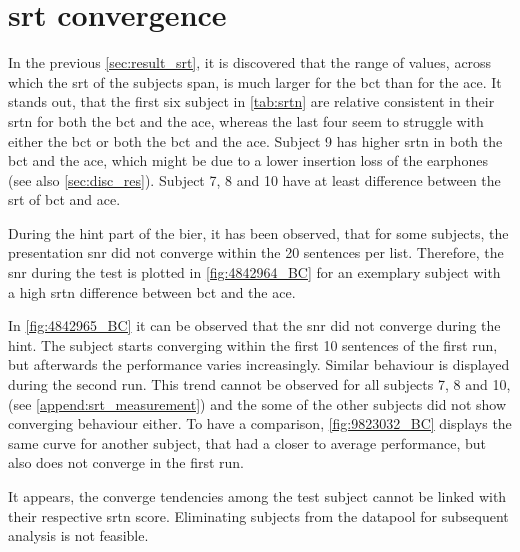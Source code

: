 \section{\gls{srt} convergence}
In the previous \autoref{sec:result_srt}, it is discovered that the range of values, across which the \gls{srt} of the subjects span, is much larger for the \gls{bct} than for the \gls{ace}. 
It stands out, that the first six subject in \autoref{tab:srtn} are relative consistent in their \gls{srtn} for both the \gls{bct} and the \gls{ace}, whereas the last four seem to struggle with either the \gls{bct} or both the \gls{bct} and the \gls{ace}. Subject 9 has higher \gls{srtn} in both the \gls{bct} and the \gls{ace}, which might be due to a lower insertion loss of the earphones (see also \autoref{sec:disc_res}). Subject 7, 8 and 10 have at least  difference between the \gls{srt} of \gls{bct} and \gls{ace}. 


During the \gls{hint} part of the \gls{bier}, it has been observed, that for some subjects, the presentation \gls{snr} did not converge within the 20 sentences per list. 
Therefore, the \gls{snr} during the test is plotted in \autoref{fig:4842964_BC} for an exemplary subject with a high \gls{srtn} difference between \gls{bct} and the \gls{ace}. 



In \autoref{fig:4842965_BC} it can be observed that the \gls{snr} did not converge during the \gls{hint}. The subject starts converging within the first 10 sentences of the first run, but afterwards the performance varies increasingly. Similar behaviour is displayed during the second run.
This trend cannot be observed for all subjects 7, 8 and 10, (see \autoref{append:srt_measurement}) and the some of the other subjects did not show converging behaviour either. 
To have a comparison, \autoref{fig:9823032_BC} displays the same curve for another subject, that had a closer to average performance, but also does not converge in the first run.

It appears, the converge tendencies among the test subject cannot be linked with their respective \gls{srtn} score. Eliminating subjects from the datapool for subsequent analysis is not feasible.